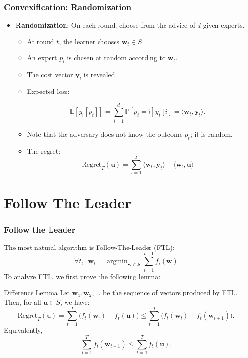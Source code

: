 \documentclass{beamer}
\DeclareMathOperator*{\argmin}{argmin}
\newcommand{\y}{\mathbf{y}}
\newcommand{\uu}{\mathbf{u}}
\newcommand{\w}{\mathbf{w}}
\begin{document}
\begin{frame}
\frametitle{Convexification: Randomization}

\begin{itemize}
\item \textbf{Randomization}:
On each round, choose from the advice of $d$ given experts.
\begin{itemize}

\item At round $t$, the learner chooses $\w_t \in S$
\item  An expert $p_t$ is chosen at random according to $\w_t$. 
\item
The cost vector $\y_t$ is revealed.
\pause
\item Expected loss: 

$$\mathbb{E}[y_t[p_t]] = \sum_{i = 1}^{d} \mathbb{P}[p_t = i] y_t[i] = \langle \w_t, \y_t \rangle.$$

\item Note that the adversary does not know the outcome $p_t$; it is random.

\pause 
\item The regret:
\begin{equation*}
\mathrm{Regret}_T(\uu) = \sum_{t = 1}^{T}  \langle \w_t, \y_t \rangle - \langle \w_t, \uu \rangle
\end{equation*}
\end{itemize}
\end{itemize}
\end{frame}


\section{Follow The Leader}

\frame{\sectionpage}

\begin{frame}
\frametitle{Follow the Leader}
The most natural algorithm is Follow-The-Leader (FTL):
\begin{equation*}
\forall t, \;\; \w_t = \argmin_{\w \in S} \sum_{i = 1}^{t-1} f_i(\w)
\end{equation*}
\pause
To analyze FTL, we first prove the following lemma:

\begin{block}{Difference Lemma}
\label{diff_lemma}
Let $\w_1, \w_2, \dots$ be the sequence of vectors produced by FTL. Then, for all $\uu \in S$, we have:
\vspace{-0.4cm}
$$\mathrm{Regret}_T(\uu) = \sum_{t = 1}^{T} \big(f_t(\w_t) - f_t(\uu)\big) \leq \sum_{t = 1}^{T} \big(f_t(\w_t) - f_t(\w_{t+1})\big).$$
\vspace{-0.4cm}
Equivalently, \begin{equation}
\label{eq4}
\sum_{t = 1}^{T} f_t(\w_{t+1}) \leq \sum_{t = 1}^{T} f_t(\uu).
\end{equation}

\end{block}
\end{frame}
\end{document}
